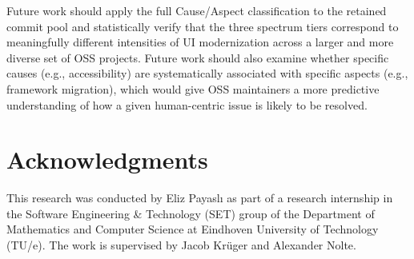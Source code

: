 \documentclass{article}
\begin{document}
Future work should apply the full Cause/Aspect classification to the
retained commit pool and statistically verify that the three spectrum
tiers correspond to meaningfully different intensities of UI
modernization across a larger and more diverse set of OSS projects.
Future work should also examine whether specific causes (e.g.,
accessibility) are systematically associated with specific aspects
(e.g., framework migration), which would give OSS maintainers a more
predictive understanding of how a given human-centric issue is likely
to be resolved.

\newpage
\section*{Acknowledgments}

This research was conducted by Eliz Payaslı as part of a
research internship in the Software Engineering \& Technology (SET) group
of the Department of Mathematics and Computer Science at Eindhoven
University of Technology (TU/e). The work is supervised by Jacob Krüger
and Alexander Nolte.
\end{document}
